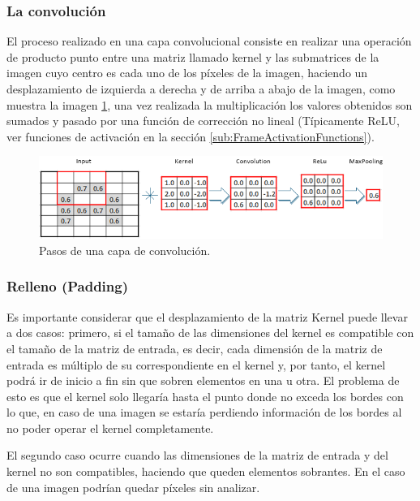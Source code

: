         \subsubsection{La convolución}
            El proceso realizado en una capa convolucional consiste en realizar una operación de producto punto entre una matriz llamado kernel y las submatrices de la imagen cuyo centro es cada uno de los píxeles de la imagen, haciendo un desplazamiento de izquierda a derecha y de arriba a abajo de la imagen, como muestra la imagen \ref{fig:ConvolutionSteps}, una vez realizada la multiplicación los valores obtenidos son sumados y pasado por una función de corrección no lineal (Típicamente ReLU, ver funciones de activación en la sección \ref{sub:FrameActivationFunctions}). 
            
            \begin{figure}[ht!]
            	\centering
            	\includegraphics[width=0.8\linewidth]{imgs/02-Referential/02-Convolution.png}
            	\caption[Pasos de una capa de convolución]{Pasos de una capa de convolución.}
        	    \label{fig:ConvolutionSteps}
            \end{figure}%
        
        \subsubsection{Relleno (Padding)}
            Es importante considerar que el desplazamiento de la matriz Kernel puede llevar a dos casos: primero, si el tamaño de las dimensiones del kernel es compatible con el tamaño de la matriz de entrada, es decir, cada dimensión de la matriz de entrada es múltiplo de su correspondiente en el kernel y, por tanto, el kernel podrá ir de inicio a fin sin que sobren elementos en una u otra. El problema de esto es que el kernel solo llegaría hasta el punto donde no exceda los bordes con lo que, en caso de una imagen se estaría perdiendo información de los bordes al no poder operar el kernel completamente.
            
            El segundo caso ocurre cuando las dimensiones de la matriz de entrada y del kernel no son compatibles, haciendo que queden elementos sobrantes. En el caso de una imagen podrían quedar píxeles sin analizar.
            
